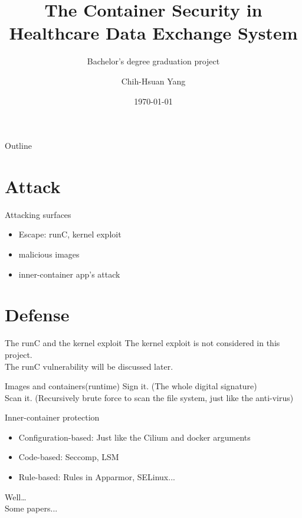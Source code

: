 \documentclass{beamer}
\title{The Container Security in Healthcare Data Exchange System}
\subtitle{Bachelor's degree graduation project}
\author{Chih-Hsuan Yang}
\institute{National Sun Yat-sen University\\
Advisor: Chun-I Fan
}
\date{\today}
\begin{document}
\begin{CJK*}{UTF8}{bsmi}

  \begin{frame}
    \titlepage
  \end{frame}


  \begin{frame}{Outline}
    \begin{multicols}{2}
      \tableofcontents
    \end{multicols}
  \end{frame}

  \section{Attack}
  \begin{frame}{Attacking surfaces}
    \begin{itemize}
      \item Escape: runC, kernel exploit
      \item malicious images
      \item inner-container app's attack
    \end{itemize}
  \end{frame}

  \section{Defense}
  \begin{frame}{The runC and the kernel exploit}
    The kernel exploit is not considered in this project.\\
    The runC vulnerability will be discussed later.
  \end{frame}

  \begin{frame}{Images and containers(runtime)}
    Sign it. (The whole digital signature)\\
    Scan it. (Recursively brute force to scan the file system, just like the anti-virus)
  \end{frame}

  \begin{frame}{Inner-container protection}
    \begin{itemize}
      \item Configuration-based: Just like the Cilium and docker arguments
      \item Code-based: Seccomp, LSM
      \item {\color{green} Rule-based}: Rules in Apparmor, SELinux...
    \end{itemize}
    Well\dots\\
    Some papers... \cite*{217614, Gao2017ContainerLeaksES, Access_Control_Architecture}
  \end{frame}


\end{CJK*}
\end{document}
